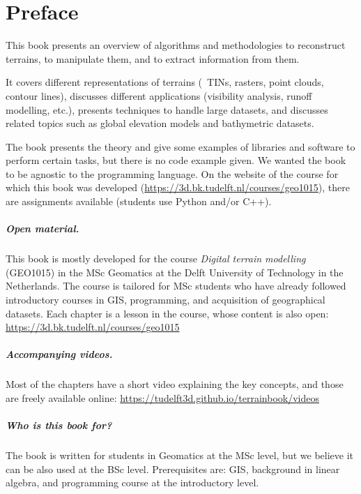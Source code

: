 


\chapter*{Preface}

This book presents an overview of algorithms and methodologies to reconstruct terrains, to manipulate them, and to extract information from them.

It covers different representations of terrains (\eg\ TINs, rasters, point clouds, contour lines), discusses different applications (visibility analysis, runoff modelling, etc.), presents techniques to handle large datasets, and discusses related topics such as global elevation models and bathymetric datasets.

The book presents the theory and give some examples of libraries and software to perform certain tasks, but there is no code example given.
We wanted the book to be agnostic to the programming language.
On the website of the course for which this book was developed (\url{https://3d.bk.tudelft.nl/courses/geo1015}), there are assignments available (students use Python and/or C++).


\paragraph*{Open material.}
This book is mostly developed for the course \emph{Digital terrain modelling} (GEO1015) in the MSc Geomatics at the Delft University of Technology in the Netherlands.
The course is tailored for MSc students who have already followed  introductory courses in GIS, programming, and acquisition of geographical datasets.
Each chapter is a lesson in the course, whose content is also open: \url{https://3d.bk.tudelft.nl/courses/geo1015}


\paragraph*{Accompanying videos.}
Most of the chapters have a short video explaining the key concepts, and those are freely available online: \url{https://tudelft3d.github.io/terrainbook/videos}


\paragraph*{Who is this book for?}
The book is written for students in Geomatics at the MSc level, but we believe it can be also used at the BSc level.
Prerequisites are: GIS, background in linear algebra, and programming course at the introductory level.


